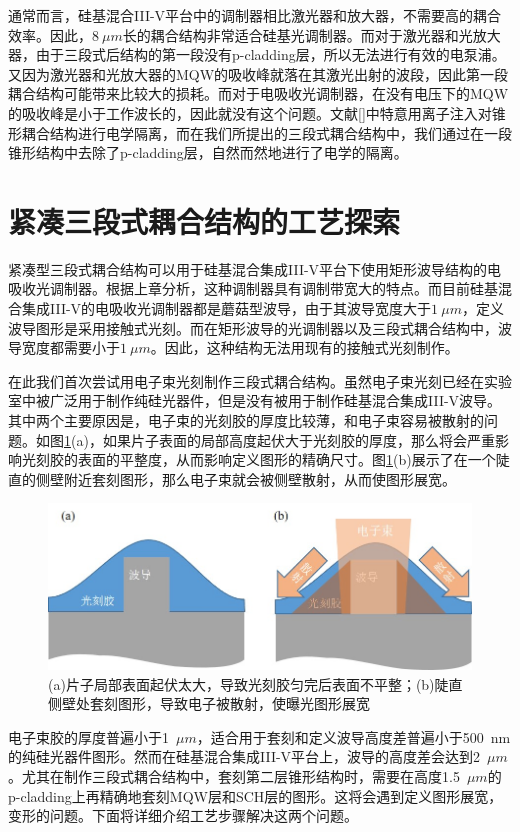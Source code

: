 通常而言，硅基混合III-V平台中的调制器相比激光器和放大器，不需要高的耦合效率。因此，$8~\mu m$长的耦合结构非常适合硅基光调制器。而对于激光器和光放大器，由于三段式后结构的第一段没有p-cladding层，所以无法进行有效的电泵浦。又因为激光器和光放大器的MQW的吸收峰就落在其激光出射的波段，因此第一段耦合结构可能带来比较大的损耗。而对于电吸收光调制器，在没有电压下的MQW的吸收峰是小于工作波长的，因此就没有这个问题。文献[]中特意用离子注入对锥形耦合结构进行电学隔离，而在我们所提出的三段式耦合结构中，我们通过在一段锥形结构中去除了p-cladding层，自然而然地进行了电学的隔离。

\section{紧凑三段式耦合结构的工艺探索}
紧凑型三段式耦合结构可以用于硅基混合集成III-V平台下使用矩形波导结构的电吸收光调制器。根据上章分析，这种调制器具有调制带宽大的特点。而目前硅基混合集成III-V的电吸收光调制器都是蘑菇型波导，由于其波导宽度大于$1~\mu m$，定义波导图形是采用接触式光刻。而在矩形波导的光调制器以及三段式耦合结构中，波导宽度都需要小于$1~\mu m$。因此，这种结构无法用现有的接触式光刻制作。

在此我们首次尝试用电子束光刻制作三段式耦合结构。虽然电子束光刻已经在实验室中被广泛用于制作纯硅光器件，但是没有被用于制作硅基混合集成III-V波导。其中两个主要原因是，电子束的光刻胶的厚度比较薄，和电子束容易被散射的问题。如图\ref{fig_ch3_ele_sca}(a)，如果片子表面的局部高度起伏大于光刻胶的厚度，那么将会严重影响光刻胶的表面的平整度，从而影响定义图形的精确尺寸。图\ref{fig_ch3_ele_sca}(b)展示了在一个陡直的侧壁附近套刻图形，那么电子束就会被侧壁散射，从而使图形展宽。
\begin{figure}[htb]
	\centering
	\includegraphics[width=12cm]{./Pictures/fig_ch3_ele_sca.jpg}
	\caption{(a)片子局部表面起伏太大，导致光刻胶匀完后表面不平整；(b)陡直侧壁处套刻图形，导致电子被散射，使曝光图形展宽}
	\label{fig_ch3_ele_sca}
\end{figure}

电子束胶的厚度普遍小于1~$\mu m$，适合用于套刻和定义波导高度差普遍小于500~nm的纯硅光器件图形。然而在硅基混合集成III-V平台上，波导的高度差会达到2~$\mu m$。尤其在制作三段式耦合结构中，套刻第二层锥形结构时，需要在高度1.5~$\mu m$的p-cladding上再精确地套刻MQW层和SCH层的图形。这将会遇到定义图形展宽，变形的问题。下面将详细介绍工艺步骤解决这两个问题。

